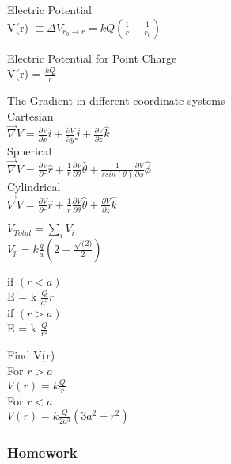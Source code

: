 \documentclass{article}
\begin{document}
\vspace{2mm}

\noindent
Electric Potential \\
V(r) $\equiv \Delta V_{r_0 \to r} = kQ(\frac{1}{r} - \frac{1}{r_0})$

\vspace{2mm}

\noindent
Electric Potential for Point Charge \\
V(r) = $\frac{kQ}{r}$

\vspace{2mm}

\noindent
The Gradient in different coordinate systems \\
Cartesian \\
$\vec{\nabla}V = \frac{\partial V}{\partial x}\hat{i} + \frac{\partial V}{\partial y}\hat{j}+\frac{\partial V}{\partial z}\hat{k}$ \\
Spherical \\
$\vec{\nabla}V = \frac{\partial V}{\partial r}\hat{r} + \frac{1}{r}\frac{\partial V}{\partial \theta}\hat{\theta} + \frac{1}{r sin(\theta)}\frac{\partial V}{\partial \phi}\hat{\phi}$ \\
Cylindrical \\
$\vec{\nabla}V = \frac{\partial V}{\partial r}\hat{r} + \frac{1}{r}\frac{\partial V}{\partial \theta}\hat{\theta} + \frac{\partial V}{\partial z}\hat{k}$

\vspace{2mm}

\noindent
$V_{Total} = \sum^{}_{i} V_i$ \\
$V_p = k\frac{q}{a}(2-\frac{\sqrt(2)}{2})$

\vspace{2mm}

\noindent
if $(r < a)$ \\
E = k $\frac{Q}{a^3}r$ \\
if $(r > a)$ \\
E = k $\frac{Q}{r^2}$

\vspace{2mm}

\noindent
Find V(r) \\
For $r > a$ \\
$V(r) = k \frac{Q}{r}$ \\
For $r < a$ \\
$V(r) = k \frac{Q}{2a^3}(3a^2 - r^2) $

\subsubsection{Homework}
\end{document}
